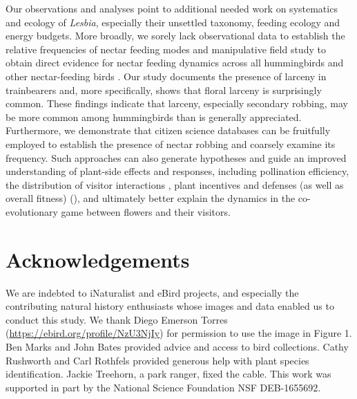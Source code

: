 \documentclass[fleqn,10pt,lineno]{wlpeerj}
\begin{document}
Our observations and analyses point to additional needed work on systematics and ecology of \textit{Lesbia}, especially their unsettled taxonomy, feeding ecology and energy budgets.  %
More broadly, we sorely lack observational data to establish the relative frequencies of nectar feeding modes and manipulative field study to obtain direct evidence for nectar feeding dynamics across all hummingbirds and other nectar-feeding birds \citep{irwin2010}.
Our study documents the presence of larceny in trainbearers and, more specifically, shows that floral larceny is surprisingly common. 
These findings indicate that larceny, especially secondary robbing, may be more common among hummingbirds than is generally appreciated.
Furthermore, we demonstrate that citizen science databases can be fruitfully employed to establish the presence of nectar robbing and coarsely examine its frequency.
Such approaches can also generate hypotheses and guide an improved understanding of plant-side effects and responses, including pollination efficiency, the distribution of visitor interactions \citep{maloof2000,arizmendi2001}, plant incentives and defenses (as well as overall fitness) (\citealt{pelayo2011}), and ultimately better explain the dynamics in the co-evolutionary game between flowers and their visitors.

\section*{Acknowledgements}

We are indebted to iNaturalist and eBird projects, and especially the contributing natural history enthusiasts whose images and data enabled us to conduct this study. 
We thank Diego Emerson Torres (\href{https://ebird.org/profile/NzU3NjIy}{https://ebird.org/profile/NzU3NjIy}) for permission to use the image in Figure 1. 
Ben Marks and John Bates provided advice and access to bird collections. 
Cathy Rushworth and Carl Rothfels provided generous help with plant species identification. 
Jackie Treehorn, a park ranger, fixed the cable.
This work was supported in part by the National Science Foundation NSF DEB-1655692.

\clearpage
\end{document}
